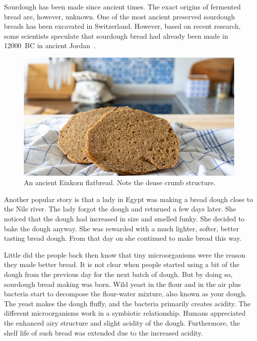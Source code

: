 Sourdough has been made since ancient times. The exact origins of fermented
bread are, however, unknown. One of the most ancient preserved
sourdough breads has been excavated in Switzerland.
However, based on recent research, some scientists speculate that sourdough
bread had already been made in \num{12000}~BC in ancient Jordan~\cite{jordan+bread}.

\begin{figure}[ht]
  \includegraphics[width=\textwidth]{einkorn-crumb}
  \caption[Ancient Einkorn flatbread]{An ancient Einkorn flatbread. Note the
      dense crumb structure.}%
  \label{einkorn-crumb}
\end{figure}

Another popular story is that a lady in Egypt was making
a bread dough close to the Nile river. The lady forgot the
dough and returned a few days later. She noticed that the dough had
increased in size and smelled funky. She decided to bake
the dough anyway. She was rewarded with a much
lighter, softer, better tasting bread dough. From that day
on she continued to make bread this way.

Little did the people back then know that tiny microorganisms
were the reason they made better bread. It is not clear when
people started using a bit of the dough from the previous
day for the next batch of dough. But by doing so, sourdough
bread making was born. Wild yeast in the flour and in the air
plus bacteria start to decompose the flour-water mixture, also
known as your dough. The yeast makes the dough fluffy, and
the bacteria primarily creates acidity. The different
microorganisms work in a symbiotic relationship. Humans
appreciated the enhanced airy structure and slight acidity
of the dough. Furthermore, the shelf life of such bread
was extended due to the increased acidity. 

